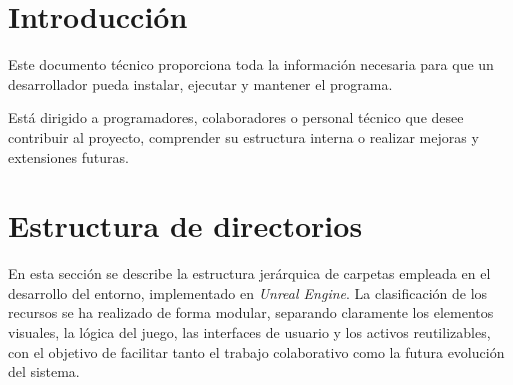 
\section{Introducción}
Este documento técnico proporciona toda la información necesaria para que un desarrollador pueda instalar, ejecutar y mantener el programa.

Está dirigido a programadores, colaboradores o personal técnico que desee contribuir al proyecto, comprender su estructura interna o realizar mejoras y extensiones futuras. 
\section{Estructura de directorios}

En esta sección se describe la estructura jerárquica de carpetas empleada en el desarrollo del entorno, implementado en \textit{Unreal Engine}. La clasificación de los recursos se ha realizado de forma modular, separando claramente los elementos visuales, la lógica del juego, las interfaces de usuario y los activos reutilizables, con el objetivo de facilitar tanto el trabajo colaborativo como la futura evolución del sistema.

